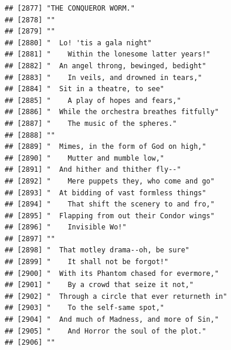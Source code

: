 \documentclass{article}\usepackage[]{graphicx}\usepackage[]{color}
\makeatletter
\newenvironment{kframe}{%
 \def\at@end@of@kframe{}%
 \ifinner\ifhmode%
  \def\at@end@of@kframe{\end{minipage}}%
  \begin{minipage}{\columnwidth}%
 \fi\fi%
 \def\FrameCommand##1{\hskip\@totalleftmargin \hskip-\fboxsep
 \colorbox{shadecolor}{##1}\hskip-\fboxsep
     \hskip-\linewidth \hskip-\@totalleftmargin \hskip\columnwidth}%
 \MakeFramed {\advance\hsize-\width
   \@totalleftmargin\z@ \linewidth\hsize
   \@setminipage}}%
 {\par\unskip\endMakeFramed%
 \at@end@of@kframe}
\newenvironment{knitrout}{}{} %
\makeatother
\begin{document}
\begin{knitrout}
\begin{kframe}
\begin{verbatim}
## [2877] "THE CONQUEROR WORM."                                                         
## [2878] ""                                                                            
## [2879] ""                                                                            
## [2880] "  Lo! 'tis a gala night"                                                     
## [2881] "    Within the lonesome latter years!"                                       
## [2882] "  An angel throng, bewinged, bedight"                                        
## [2883] "    In veils, and drowned in tears,"                                         
## [2884] "  Sit in a theatre, to see"                                                  
## [2885] "    A play of hopes and fears,"                                              
## [2886] "  While the orchestra breathes fitfully"                                     
## [2887] "    The music of the spheres."                                               
## [2888] ""                                                                            
## [2889] "  Mimes, in the form of God on high,"                                        
## [2890] "    Mutter and mumble low,"                                                  
## [2891] "  And hither and thither fly--"                                              
## [2892] "    Mere puppets they, who come and go"                                      
## [2893] "  At bidding of vast formless things"                                        
## [2894] "    That shift the scenery to and fro,"                                      
## [2895] "  Flapping from out their Condor wings"                                      
## [2896] "    Invisible Wo!"                                                           
## [2897] ""                                                                            
## [2898] "  That motley drama--oh, be sure"                                            
## [2899] "    It shall not be forgot!"                                                 
## [2900] "  With its Phantom chased for evermore,"                                     
## [2901] "    By a crowd that seize it not,"                                           
## [2902] "  Through a circle that ever returneth in"                                   
## [2903] "    To the self-same spot,"                                                  
## [2904] "  And much of Madness, and more of Sin,"                                     
## [2905] "    And Horror the soul of the plot."                                        
## [2906] ""                                                                            

\end{verbatim}
\end{kframe}
\end{knitrout}
\end{document}
